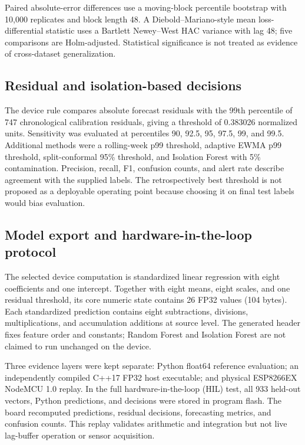 \documentclass[10pt,a4paper,twocolumn]{article}
\begin{document}
Paired absolute-error differences use a moving-block percentile bootstrap with 10,000 replicates and block length 48. A Diebold--Mariano-style mean loss-differential statistic uses a Bartlett Newey--West HAC variance with lag 48; five comparisons are Holm-adjusted. Statistical significance is not treated as evidence of cross-dataset generalization.

\subsection{Residual and isolation-based decisions}
The device rule compares absolute forecast residuals with the 99th percentile of 747 chronological calibration residuals, giving a threshold of 0.383026 normalized units. Sensitivity was evaluated at percentiles 90, 92.5, 95, 97.5, 99, and 99.5. Additional methods were a rolling-week p99 threshold, adaptive EWMA p99 threshold, split-conformal 95\% threshold, and Isolation Forest with 5\% contamination. Precision, recall, F1, confusion counts, and alert rate describe agreement with the supplied labels. The retrospectively best threshold is not proposed as a deployable operating point because choosing it on final test labels would bias evaluation.

\subsection{Model export and hardware-in-the-loop protocol}
The selected device computation is standardized linear regression with eight coefficients and one intercept. Together with eight means, eight scales, and one residual threshold, its core numeric state contains 26 FP32 values (104 bytes). Each standardized prediction contains eight subtractions, divisions, multiplications, and accumulation additions at source level. The generated header fixes feature order and constants; Random Forest and Isolation Forest are not claimed to run unchanged on the device.

Three evidence layers were kept separate: Python float64 reference evaluation; an independently compiled C++17 FP32 host executable; and physical ESP8266EX NodeMCU 1.0 replay. In the full hardware-in-the-loop (HIL) test, all 933 held-out vectors, Python predictions, and decisions were stored in program flash. The board recomputed predictions, residual decisions, forecasting metrics, and confusion counts. This replay validates arithmetic and integration but not live lag-buffer operation or sensor acquisition.
\end{document}
